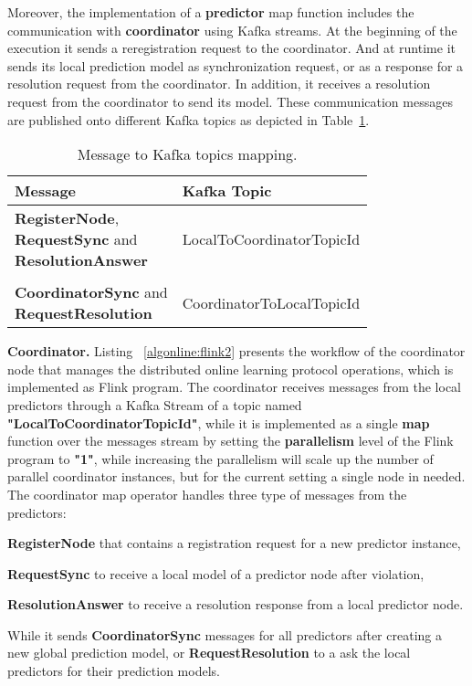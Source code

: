 \par Moreover, the implementation of  a \textbf{predictor} map function includes the communication  with \textbf{coordinator} using Kafka streams. At the beginning of the execution it sends a reregistration request to the coordinator. And at runtime it sends  its local prediction model as synchronization request,  or as a response for a resolution request from the coordinator. In addition, it receives a resolution request from the coordinator to send its model. These communication messages are published onto different  Kafka topics as depicted in Table~\ref{tab:messagesToTopics}. 

\begin{table}[h]
	\caption{Message to Kafka topics mapping.}
	\label{tab:messagesToTopics}
	\begin{tabular}{p{3cm}l}
		\toprule
		Message &Kafka Topic\\
		\midrule
		\parbox[t]{4cm}{\textbf{RegisterNode}, \\ \textbf{RequestSync} and \\\textbf{ResolutionAnswer} } &LocalToCoordinatorTopicId\\ \\
		
			  \parbox[t]{4cm}{\textbf{CoordinatorSync} and \\ \textbf{RequestResolution}} &CoordinatorToLocalTopicId\\
		
		\bottomrule
	\end{tabular}
\end{table}


\textbf{Coordinator.} Listing ~\ref{algonline:flink2} presents the workflow of the coordinator node that manages the distributed online learning protocol operations, which is implemented as Flink program. The coordinator receives messages from the local predictors through a Kafka Stream of a topic named \textbf{"LocalToCoordinatorTopicId"}, while it is implemented as a single \textbf{map} function over the messages stream by setting the \textbf{parallelism} level of the Flink program to \textbf{"1"}, while increasing the parallelism will scale up the number of parallel coordinator instances, but for the current setting a single node in needed. The coordinator map operator handles three type of messages from the predictors: \begin{enumerate*}[(i)]
	\item \textbf{RegisterNode} that contains  a registration request for a new predictor instance,
	\item \textbf{RequestSync} to receive a local model of a predictor node after violation,
	\item \textbf{ResolutionAnswer} to receive a resolution response from  a local predictor node.  
\end{enumerate*}  
 While it sends \textbf{CoordinatorSync} messages for all predictors after creating a new global prediction model, or \textbf{RequestResolution} to a ask the local predictors for their prediction models.
 

